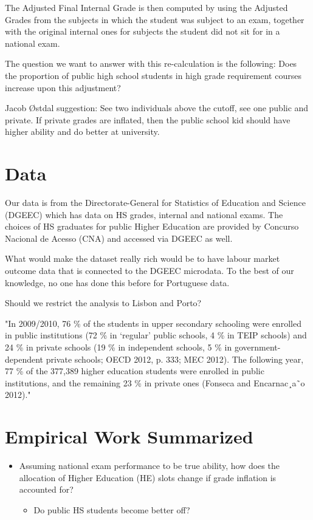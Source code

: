 \documentclass{article}
\begin{document}
The Adjusted Final Internal Grade is then computed by using the Adjusted Grades from the subjects in which the student was subject to an exam, together with the original internal ones for subjects the student did not sit for in a national exam.  

The question we want to answer with this re-calculation is the following: Does the proportion of public high school students in high grade requirement courses increase upon this adjustment?

Jacob Østdal suggestion: See two individuals above the cutoff, see one public and private. If private grades are inflated, then the public school kid should have higher ability and do better at university.

\section{Data}
Our data is from the Directorate-General for Statistics of Education and Science (DGEEC) which has data on HS grades, internal and national exams. The choices of HS graduates for public Higher Education are provided by Concurso Nacional de Acesso (CNA) and accessed via DGEEC as well.

What would make the dataset really rich would be to have labour market outcome data that is connected to the DGEEC microdata. To the best of our knowledge, no one has done this before for Portuguese data.

Should we restrict the analysis to Lisbon and Porto?

"In 2009/2010, 76 \% of the students in upper secondary schooling were enrolled in
public institutions (72 \% in ‘regular’ public schools, 4 \% in TEIP schools) and 24 \% in
private schools (19 \% in independent schools, 5 \% in government-dependent private
schools; OECD 2012, p. 333; MEC 2012). The following year, 77 \% of the 377,389 higher
education students were enrolled in public institutions, and the remaining 23 \% in private
ones (Fonseca and Encarnac¸a˜o 2012)."

\section{Empirical Work Summarized}
\begin{itemize}
    \item Assuming national exam performance to be true ability, how does the allocation of Higher Education (HE) slots change if grade inflation is accounted for?
    \begin{itemize}
        \item Do public HS students become better off?
    \end{itemize}
\end{itemize}
\end{document}
